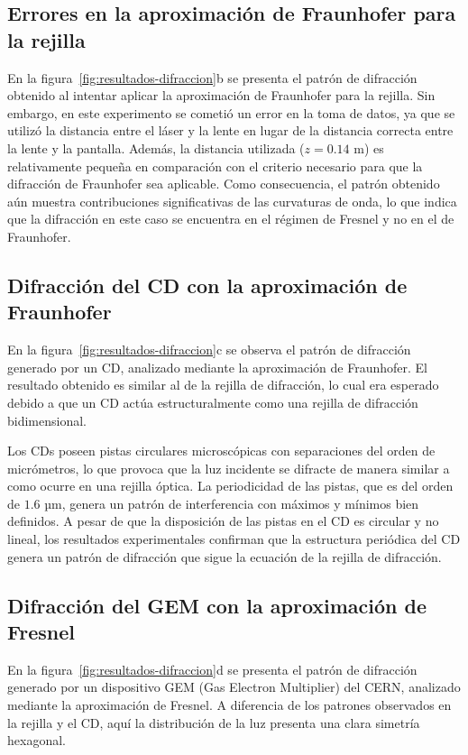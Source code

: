 \documentclass[6pt,a4paper]{article}
\begin{document}
\subsection{Errores en la aproximación de Fraunhofer para la rejilla}

En la figura~\ref{fig:resultados-difraccion}b se presenta el patrón de difracción obtenido al intentar aplicar la aproximación de Fraunhofer para la rejilla. Sin embargo, en este experimento se cometió un error en la toma de datos, ya que se utilizó la distancia entre el láser y la lente en lugar de la distancia correcta entre la lente y la pantalla. Además, la distancia utilizada (\( z = 0.14 \) m) es relativamente pequeña en comparación con el criterio necesario para que la difracción de Fraunhofer sea aplicable. Como consecuencia, el patrón obtenido aún muestra contribuciones significativas de las curvaturas de onda, lo que indica que la difracción en este caso se encuentra en el régimen de Fresnel y no en el de Fraunhofer.

\subsection{Difracción del CD con la aproximación de Fraunhofer}

En la figura~\ref{fig:resultados-difraccion}c se observa el patrón de difracción generado por un CD, analizado mediante la aproximación de Fraunhofer. El resultado obtenido es similar al de la rejilla de difracción, lo cual era esperado debido a que un CD actúa estructuralmente como una rejilla de difracción bidimensional. 

Los CDs poseen pistas circulares microscópicas con separaciones del orden de micrómetros, lo que provoca que la luz incidente se difracte de manera similar a como ocurre en una rejilla óptica. La periodicidad de las pistas, que es del orden de \( 1.6 \) µm, genera un patrón de interferencia con máximos y mínimos bien definidos. A pesar de que la disposición de las pistas en el CD es circular y no lineal, los resultados experimentales confirman que la estructura periódica del CD genera un patrón de difracción que sigue la ecuación de la rejilla de difracción.

\subsection{Difracción del GEM con la aproximación de Fresnel}

En la figura~\ref{fig:resultados-difraccion}d se presenta el patrón de difracción generado por un dispositivo GEM (Gas Electron Multiplier) del CERN, analizado mediante la aproximación de Fresnel. A diferencia de los patrones observados en la rejilla y el CD, aquí la distribución de la luz presenta una clara simetría hexagonal. 
\end{document}
